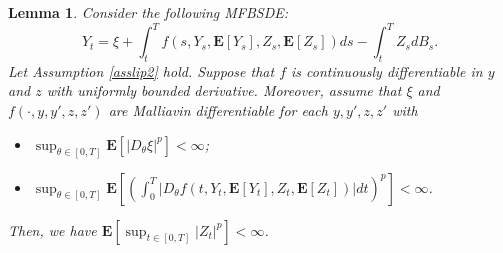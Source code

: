 \documentclass[10pt]{article}%
\numberwithin{equation}{section}
\newtheorem{lemma}[theorem]{Lemma}
\begin{document}
\begin{lemma}\label{estimateDYDZ}
 Consider the following MFBSDE:
\begin{equation}\label{MFBSDEm}
  Y_t=\xi+\int_t^T f(s,Y_s,\mathbf{E}[Y_s],Z_s,\mathbf{E}[Z_s])ds-\int_t^T Z_s dB_s.  
\end{equation}
Let Assumption \ref{asslip2} hold. Suppose that $f$ is continuously differentiable in $y$ and $z$ with uniformly bounded derivative. Moreover, assume that $\xi$ and $f(\cdot, y,y',z,z')$ are Malliavin differentiable for each $y,y',z,z'$ with 
    \begin{itemize}
        \item [(i)] $\sup_{\theta \in[0,T]}\mathbf{E}\left[|D_{\theta}\xi|^p\right]<\infty$;
        \item [(ii)] $\sup_{\theta \in[0,T]}\mathbf{E}\left[\left(\int_{0}^{T}|D_{\theta}f(t,Y_t,\mathbf{E}[Y_t],Z_t,\mathbf{E}[Z_t])|dt\right)^{p}\right]<\infty$.
    \end{itemize}  
    Then, we have $\mathbf{E}\left[\sup_{t\in[0,T]}\left|Z_t\right|^p\right]<\infty$. %
\end{lemma}
\end{document}
